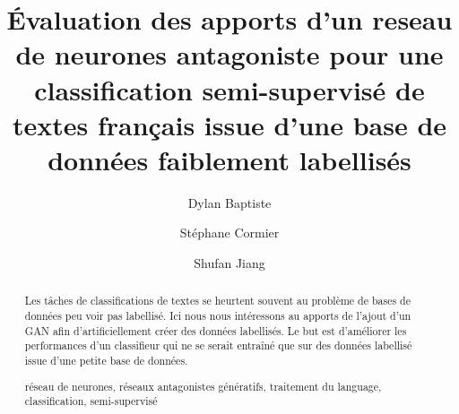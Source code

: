 \documentclass[francais,runningheads,a4paper]{llncs}
\newcommand{\keywords}[1]{\par\addvspace\baselineskip
\noindent\keywordname\enspace\ignorespaces#1}
\begin{document}
\mainmatter  %

\title{Évaluation des apports d'un reseau de neurones antagoniste pour une classification semi-supervisé de textes français issue d'une base de données faiblement labellisés}


%
%
\author{Dylan Baptiste \and Stéphane Cormier \and Shufan Jiang}
%


%
%

\toctitle{}
\tocauthor{}
\maketitle

\graphicspath{ {../src/} }

\begin{abstract}
Les tâches de classifications de textes se heurtent souvent au problème de bases de données peu voir pas labellisé. Ici nous nous intéressons au apports de l'ajout d'un GAN afin d'artificiellement créer des données labellisés. Le but est d'améliorer les performances d'un classifieur qui ne se serait entraîné que sur des données labellisé issue d'une petite base de données.
\keywords{réseau de neurones, réseaux antagonistes génératifs, traitement du language, classification, semi-supervisé}
\end{abstract}
\end{document}
